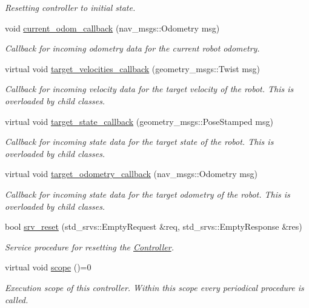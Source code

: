 \begin{DoxyCompactItemize}
\begin{DoxyCompactList}\small\item\em Resetting controller to initial state. \end{DoxyCompactList}\item 
void \hyperlink{classController_a35b38608f67e7c1c34f6b7186db32ad7}{current\+\_\+odom\+\_\+callback} (nav\+\_\+msgs\+::\+Odometry msg)
\begin{DoxyCompactList}\small\item\em Callback for incoming odometry data for the current robot odometry. \end{DoxyCompactList}\item 
virtual void \hyperlink{classController_afa31080c1ed1e652410c5e97472b3ea5}{target\+\_\+velocities\+\_\+callback} (geometry\+\_\+msgs\+::\+Twist msg)
\begin{DoxyCompactList}\small\item\em Callback for incoming velocity data for the target velocity of the robot. This is overloaded by child classes. \end{DoxyCompactList}\item 
virtual void \hyperlink{classController_a60f59dd761ce2d41dc9254f87164ded1}{target\+\_\+state\+\_\+callback} (geometry\+\_\+msgs\+::\+Pose\+Stamped msg)
\begin{DoxyCompactList}\small\item\em Callback for incoming state data for the target state of the robot. This is overloaded by child classes. \end{DoxyCompactList}\item 
virtual void \hyperlink{classController_ad9ccaff0c6f9989bd6c33a3d2179124d}{target\+\_\+odometry\+\_\+callback} (nav\+\_\+msgs\+::\+Odometry msg)
\begin{DoxyCompactList}\small\item\em Callback for incoming state data for the target odometry of the robot. This is overloaded by child classes. \end{DoxyCompactList}\item 
bool \hyperlink{classController_ae24861b9ecd088dc3a58db860fc417b1}{srv\+\_\+reset} (std\+\_\+srvs\+::\+Empty\+Request \&req, std\+\_\+srvs\+::\+Empty\+Response \&res)
\begin{DoxyCompactList}\small\item\em Service procedure for resetting the \hyperlink{classController}{Controller}. \end{DoxyCompactList}\item 
virtual void \hyperlink{classController_af89e3d7ed87318418f0168727bd98f0f}{scope} ()=0\hypertarget{classController_af89e3d7ed87318418f0168727bd98f0f}{}\label{classController_af89e3d7ed87318418f0168727bd98f0f}

\begin{DoxyCompactList}\small\item\em Execution scope of this controller. Within this scope every periodical procedure is called. \end{DoxyCompactList}\end{DoxyCompactItemize}
